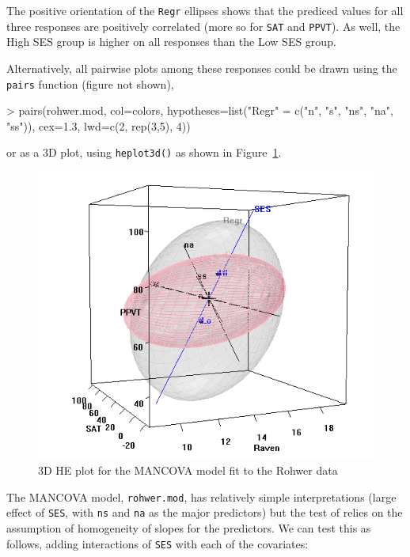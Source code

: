 \documentclass[11pt]{article}
\newcommand{\figref}[1]{Figure~\ref{#1}}
\newcommand{\code}[1]{{\texttt{#1}}}
\newcommand{\func}[1]{{\texttt{#1()}}}
\begin{document}
The positive orientation of the \code{Regr} ellipses shows that the prediced
values for all three responses are positively correlated (more so for
\code{SAT} and \code{PPVT}). As well, the High SES group
is higher on all responses than the Low SES group.

Alternatively, all pairwise plots among these responses could be drawn using
the \code{pairs} function (figure not shown),

\begin{Schunk}
\begin{Sinput}
> pairs(rohwer.mod, col=colors,
        hypotheses=list("Regr" = c("n", "s", "ns", "na", "ss")),
        cex=1.3, lwd=c(2, rep(3,5), 4))
\end{Sinput}
\end{Schunk}
or as a 3D plot, using \func{heplot3d} as shown in \figref{fig:rohwer-HE3D}.
\begin{Schunk}
\end{Schunk}
\begin{figure}[htb]
\begin{center}
	\includegraphics[width=.6\textwidth]{rohwer-HE3D}
\caption{3D HE plot for the MANCOVA model fit to the Rohwer data}
\label{fig:rohwer-HE3D}
\end{center}
\end{figure}

The MANCOVA model, \code{rohwer.mod}, has relatively simple interpretations
(large effect of \code{SES}, with \code{ns} and \code{na} as the major predictors)
but the test of relies on the assumption of homogeneity of slopes for the predictors.
We can test this as follows, adding interactions of \code{SES}
with each of the covariates:
\end{document}
